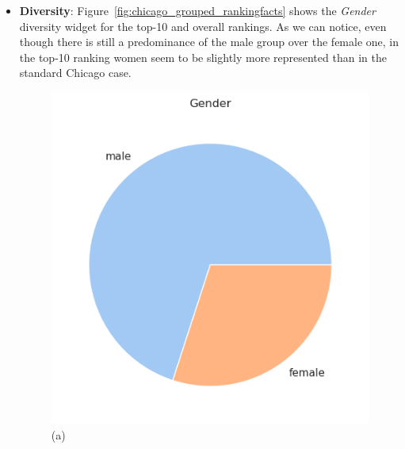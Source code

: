 \begin{itemize}
\begin{itemize}
\item \textbf{Diversity}: Figure~\ref{fig:chicago_grouped_rankingfacts} shows the \textit{Gender} diversity widget for the top-10 and overall rankings. As we can notice, even though there is still a predominance of the male group over the female one, in the top-10 ranking women seem to be slightly more represented than in the standard Chicago case.

\begin{figure}[t!]
\centering
\begin{minipage}{0.45\textwidth}
\centering
\includegraphics[width=\textwidth]{figures/chicago_grouped_rankingfacts1a.png}
\caption*{(a)}
\end{minipage}
\begin{minipage}{0.45\textwidth}
\centering

\end{minipage}
\end{figure}
\end{itemize}
\end{itemize}
